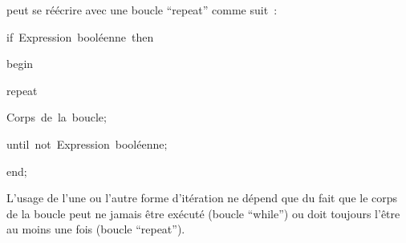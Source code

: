 {\begin{minipage}{\myparboxwidth}
\noindent peut se réécrire avec une boucle ``repeat'' comme suit~:

{
\parindent {}
\medskip

\mbox{\blc  \blk\mcl if\ \small\rm Expression booléenne\ then}\par 
\mbox{\blc  \blk\blk \mcl begin}\par 
\mbox{\blc  \blk\blk\blk\mcl repeat}\par 
\mbox{\blc  \blk\blk\blk\blk\small\rm Corps de la boucle$;$}\par 
\mbox{\blc  \blk\blk\blk\mcl until\ not\ \small\rm Expression booléenne$;$}\par 
\mbox{\blc  \blk\blk\mcl end$;$}\par 

\medskip }

L'usage de l'une ou l'autre forme d'itération ne dépend que du fait que le corps de la boucle
peut ne jamais être exécuté (boucle ``while'') ou doit toujours l'être au moins une fois
(boucle ``repeat'').

\vspace{\abovedisplayskip}
\end{minipage}
}


